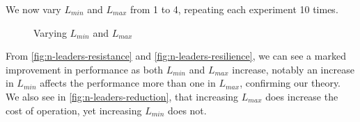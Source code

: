 We now vary $L_{min}$ and $L_{max}$ from 1 to 4, repeating each experiment 10 times.
\begin{figure}[!ht]
	\centering
	\caption{Varying $L_{min}$ and $L_{max}$}
\end{figure}

From \autoref{fig:n-leaders-resistance} and \autoref{fig:n-leaders-resilience}, we can see a marked improvement in performance as both $L_{min}$ and $L_{max}$ increase, notably an increase in $L_{min}$ affects the performance more than one in $L_{max}$, confirming our theory. We also see in \autoref{fig:n-leaders-reduction}, that increasing $L_{max}$ does increase the cost of operation, yet increasing $L_{min}$ does not.